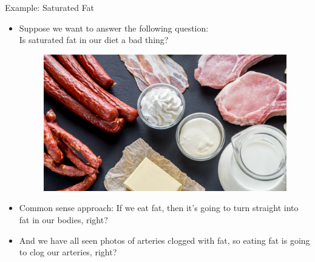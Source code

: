 \documentclass[handout]{beamer}
\begin{document}
\begin{frame}{Example: Saturated Fat}

\scriptsize{
\begin{itemize}
\item Suppose we want to answer the following question: \\ Is saturated fat in our diet a bad thing?

\begin{figure}[h!]
	\centering
	\includegraphics[scale=0.1]{pics/saturated-fat.jpg}
\end{figure}

\item Common sense approach: If we eat fat, then it's going to turn straight into fat in our bodies, right?
\item And we have all seen photos of arteries clogged with fat, so eating fat is going to clog our arteries, right?


\end{itemize}

}
 
\end{frame}
\end{document}
